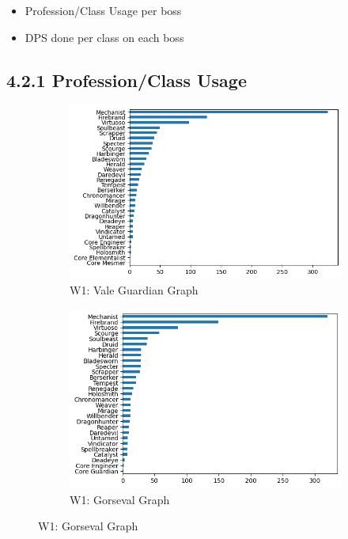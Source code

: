 \documentclass[12pt,a4paper]{article}
\begin{document}
    \begin{itemize}
        \item Profession/Class Usage per boss
        \item DPS done per class on each boss
    \end{itemize}

    \bigskip

    \subsection*{\normalsize 4.2.1 Profession/Class Usage}

    \begin{figure}[h!]

        \centering

        \begin{subfigure}{0.5\textwidth}
            \centering
            \includegraphics[scale=0.4]{vg_graph.png}
            \caption{\small W1: Vale Guardian Graph}
        \end{subfigure}%
        \begin{subfigure}{0.5\textwidth}
            \centering
            \includegraphics[scale=0.4]{gors_graph.png}
            \caption{\small W1: Gorseval Graph}
        \end{subfigure}
    \end{figure}
\end{document}
